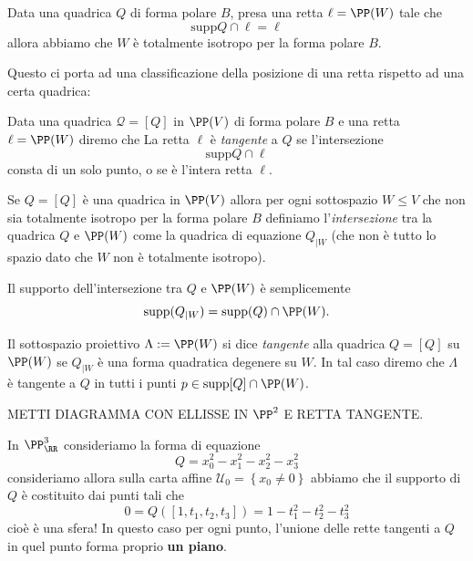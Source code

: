 \documentclass[11pt]{scrartcl}
\begin{document}
	\begin{remark}
		Data una quadrica $Q$ di forma polare $B$, presa una retta $\ell=\PP(W)$ tale che 
		$$\text{supp}Q\cap \ell = \ell$$
		allora abbiamo che $W$ è totalmente isotropo per la forma polare $B$.
	\end{remark} 
	Questo ci porta ad una classificazione della posizione di una retta rispetto ad una certa quadrica:
	\begin{definition}
		Data una quadrica $\mathcal{Q}=[Q]$ in $\PP(V)$ di forma polare $B$ e una retta $\ell = \PP(W)$ diremo che La retta $\ell$ è \textit{tangente} a $Q$ se l'intersezione 
		$$\text{supp}Q \cap \ell$$
		consta di un solo punto, o se è l'intera retta $\ell$.
	\end{definition}
	\begin{definition}
		Se $Q=[Q]$ è una quadrica in $\PP(V)$ allora per ogni sottospazio $W\le V$ che non sia totalmente isotropo per la forma polare $B$ definiamo l'\textit{intersezione} tra la quadrica $Q$ e $\PP(W)$ come la quadrica di equazione $Q_{\mid W}$ (che non è tutto lo spazio dato che $W$ non è totalmente isotropo). 
	\end{definition}
	\begin{remark}
		Il supporto dell'intersezione tra $Q$ e $\PP(W)$ è semplicemente
		$$\text{supp}(Q_{\mid W})=\text{supp}(Q)\cap \PP(W).$$
	\end{remark}
	\begin{definition}
		Il sottospazio proiettivo $\Lambda:=\PP(W)$ si dice \textit{tangente} alla quadrica $Q=[Q]$ su $\PP(W)$ se $Q_{\mid W}$ è una forma quadratica degenere su $W$. In tal caso diremo che $\Lambda$ è tangente a $Q$ in tutti i punti $p\in \text{supp}[Q]\cap \PP(W)$.  
	\end{definition}
	METTI DIAGRAMMA CON ELLISSE IN $\PP^2$ E RETTA TANGENTE.
	\begin{example}[Quadriche in $\PP^3$]
		In $\PP^3_\RR$ consideriamo la forma di equazione
		$$Q=x_0^2-x_1^2-x_2^2-x_3^2$$
		consideriamo allora sulla carta affine $\mathcal{U}_0=\left\{x_0\ne 0\right\}$ abbiamo che il supporto di $Q$ è costituito dai punti tali che
		$$0=Q\left(\left[1,t_1,t_2,t_3\right]\right)=1-t_1^2-t_2^2-t_3^2$$
		cioè è una sfera! In questo caso per ogni punto, l'unione delle rette tangenti a $Q$ in quel punto forma proprio \textbf{un piano}.
	\end{example}
\end{document}
